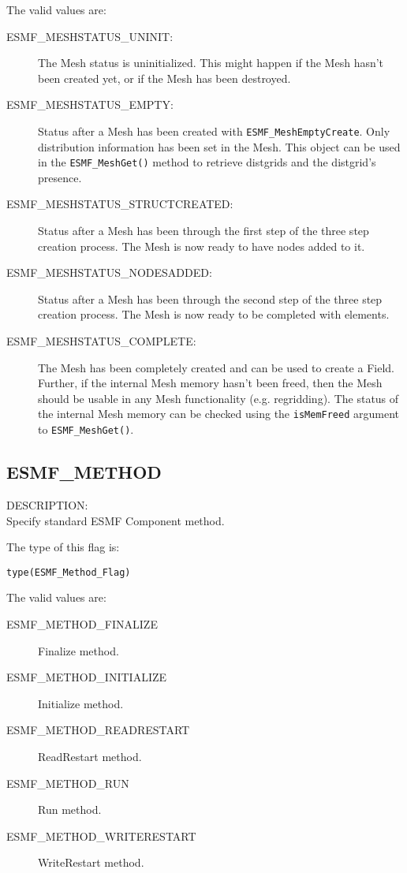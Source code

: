 The valid values are:
\begin{description}
\item [ESMF\_MESHSTATUS\_UNINIT:] The Mesh status is uninitialized. This might
       happen if the Mesh hasn't been created yet, or if the Mesh has been destroyed.
\item [ESMF\_MESHSTATUS\_EMPTY:] Status after a Mesh has been created with 
      {\tt ESMF\_MeshEmptyCreate}.  Only distribution information has been set in the Mesh. 
      This object can be used in the {\tt ESMF\_MeshGet()}
      method to retrieve distgrids and the distgrid's presence.  
\item [ESMF\_MESHSTATUS\_STRUCTCREATED:] Status after a Mesh has been through the first
      step of the three step creation process. The Mesh is now ready to have nodes added
      to it. 
\item [ESMF\_MESHSTATUS\_NODESADDED:] Status after a Mesh has been through the second
      step of the three step creation process. The Mesh is now ready to be completed with 
      elements. 
\item [ESMF\_MESHSTATUS\_COMPLETE:] The Mesh has been completely created 
      and can be used to create a Field. Further, if the internal Mesh memory hasn't been
      freed, then the Mesh should be usable in any Mesh functionality (e.g. 
      regridding). The status of the internal Mesh memory can be checked using
      the {\tt isMemFreed} argument to {\tt ESMF\_MeshGet()}.
\end{description}

\subsection{ESMF\_METHOD}
\label{const:method}

{\sf DESCRIPTION:\\}  
Specify standard ESMF Component method.

The type of this flag is:

{\tt type(ESMF\_Method\_Flag)}

The valid values are:
\begin{description}
\item [ESMF\_METHOD\_FINALIZE]
      Finalize method.
\item [ESMF\_METHOD\_INITIALIZE]
      Initialize method.
\item [ESMF\_METHOD\_READRESTART]
      ReadRestart method.
\item [ESMF\_METHOD\_RUN]
      Run method.
\item [ESMF\_METHOD\_WRITERESTART]
      WriteRestart method.
\end{description}



